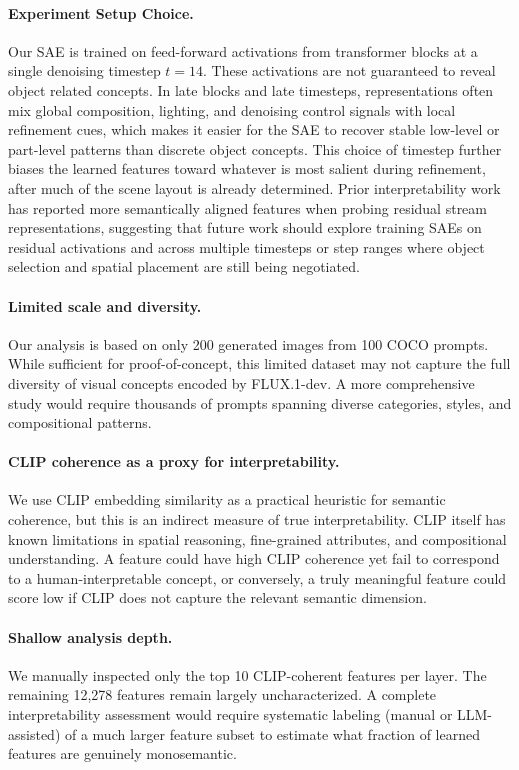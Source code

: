 \documentclass{article}
\begin{document}
\paragraph{Experiment Setup Choice.}
Our SAE is trained on feed-forward activations from transformer blocks at a single denoising timestep \(t=14\). These activations are not guaranteed to reveal object related concepts. In late blocks and late timesteps, representations often mix global composition, lighting, and denoising control signals with local refinement cues, which makes it easier for the SAE to recover stable low-level or part-level patterns than discrete object concepts. This choice of timestep further biases the learned features toward whatever is most salient during refinement, after much of the scene layout is already determined. Prior interpretability work has reported more semantically aligned features when probing residual stream representations, suggesting that future work should explore training SAEs on residual activations and across multiple timesteps or step ranges where object selection and spatial placement are still being negotiated.


\paragraph{Limited scale and diversity.}
Our analysis is based on only 200 generated images from 100 COCO prompts.
While sufficient for proof-of-concept, this limited dataset may not capture the full diversity of visual concepts encoded by FLUX.1-dev.
A more comprehensive study would require thousands of prompts spanning diverse categories, styles, and compositional patterns.

\paragraph{CLIP coherence as a proxy for interpretability.}
We use CLIP embedding similarity as a practical heuristic for semantic coherence, but this is an indirect measure of true interpretability.
CLIP itself has known limitations in spatial reasoning, fine-grained attributes, and compositional understanding.
A feature could have high CLIP coherence yet fail to correspond to a human-interpretable concept, or conversely, a truly meaningful feature could score low if CLIP does not capture the relevant semantic dimension.

\paragraph{Shallow analysis depth.}
We manually inspected only the top 10 CLIP-coherent features per layer.
The remaining 12,278 features remain largely uncharacterized.
A complete interpretability assessment would require systematic labeling (manual or LLM-assisted) of a much larger feature subset to estimate what fraction of learned features are genuinely monosemantic.
\end{document}
